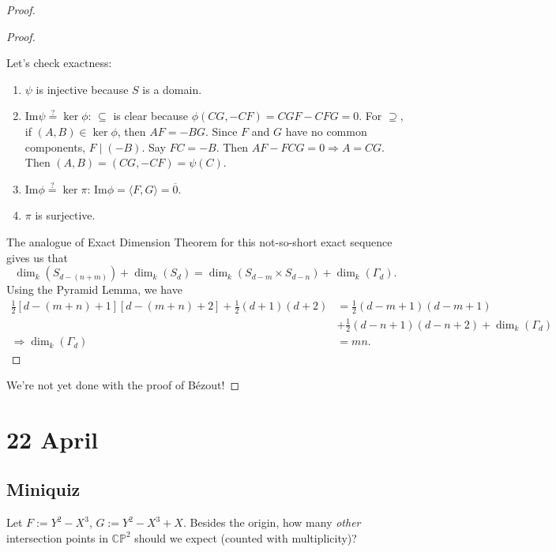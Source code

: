 \documentclass[12pt]{article}
\newcommand{\ita}[1]{\textit{#1}}
\newcommand{\vbrack}[1]{\langle #1\rangle}
\theoremstyle{definition}
\begin{document}
\begin{proof}
\begin{proof}
\begin{itemize}
        \end{itemize}
    Let's check exactness:
    \begin{enumerate}
        \item $\psi$ is injective because $S$ is a domain. \checkmark
        \item $\mathrm{Im}\psi\stackrel{?}{=}\ker\phi$: $\subseteq$ is clear because $\phi(CG,-CF)=CGF-CFG=0$. For $\supseteq$, if $(A,B)\in\ker\phi$, then $AF=-BG$. Since $F$ and $G$ have no common components, $F\mid(-B)$. Say $FC=-B$. Then $AF-FCG=0\Rightarrow A=CG$. Then $(A,B)=(CG,-CF)=\psi(C)$. \checkmark
        \item $\mathrm{Im}\phi\stackrel{?}{=}\ker\pi$: $\mathrm{Im}\phi=\vbrack{F,G}=\overline{0}$. \checkmark
        \item $\pi$ is surjective. \checkmark
        \end{enumerate}
        The analogue of Exact Dimension Theorem for this not-so-short exact sequence gives us that
        \[\dim_k(S_{d-(n+m)})+\dim_k(S_d)=\dim_k(S_{d-m}\times S_{d-n})+\dim_k(\Gamma_d).\]
        Using the Pyramid Lemma, we have
        \begin{align*}
            \frac{1}{2}[d-(m+n)+1][d-(m+n)+2]+\frac{1}{2}(d+1)(d+2)&=\frac{1}{2}(d-m+1)(d-m+1)\\
            &+\frac{1}{2}(d-n+1)(d-n+2)+\dim_k(\Gamma_d)\\
            \Rightarrow\dim_k(\Gamma_d)&=mn.
        \end{align*}
    \end{proof}
    We're not yet done with the proof of B\'ezout!
\end{proof}
\section{22 April}
\subsection{Miniquiz}
Let $F:=Y^2-X^3$, $G:=Y^2-X^3+X$. Besides the origin, how many \ita{other} intersection points in $\mathbb{CP}^2$ should we expect (counted with multiplicity)?
\end{document}
